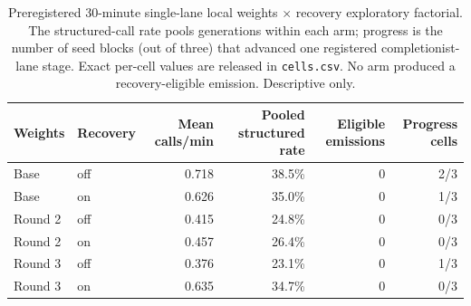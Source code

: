 \begin{table}[t]
\centering
\small
\caption{Preregistered 30-minute single-lane local weights $\times$ recovery
exploratory factorial. The structured-call rate pools generations within each
arm; progress is the number of seed blocks (out of three) that advanced one
registered completionist-lane stage. Exact per-cell values are released in
\texttt{cells.csv}. No arm produced a recovery-eligible emission. Descriptive
only.}
\label{tab:local-recovery-factorial}
\begin{tabular}{llrrrr}
\toprule
Weights & Recovery & Mean calls/min & Pooled structured rate &
Eligible emissions & Progress cells \\
\midrule
Base & off & 0.718 & 38.5\% & 0 & 2/3 \\
Base & on & 0.626 & 35.0\% & 0 & 1/3 \\
Round 2 & off & 0.415 & 24.8\% & 0 & 0/3 \\
Round 2 & on & 0.457 & 26.4\% & 0 & 0/3 \\
Round 3 & off & 0.376 & 23.1\% & 0 & 1/3 \\
Round 3 & on & 0.635 & 34.7\% & 0 & 0/3 \\
\bottomrule
\end{tabular}
\end{table}

